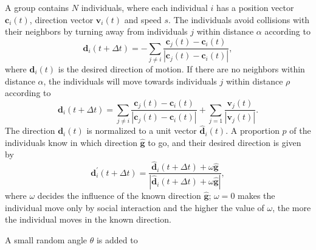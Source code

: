 A group contains $N$ individuals, where each individual $i$ has a position vector $\boldsymbol{c}_i(t)$, direction vector $\boldsymbol{v}_i(t)$ and speed $s$. The individuals avoid collisions with their neighbors by turning away from individuals $j$ within distance $\alpha$ according to
\begin{equation}
\boldsymbol{d}_i (t+\Delta t) = - \sum_{j \neq i} \frac{\boldsymbol{c}_j (t) - \boldsymbol{c}_i (t)}{|\boldsymbol{c}_j (t) - \boldsymbol{c}_i (t) |},
\label{eq:repulsion}
\end{equation}
where $\boldsymbol{d}_i(t)$ is the desired direction of motion. If there are no neighbors within distance $\alpha$, the individuals will move towards individuals $j$ within distance $\rho$ according to
\begin{equation}
\boldsymbol{d}_i (t+\Delta t) = \sum_{j \neq i} \frac{\boldsymbol{c}_j (t)- \boldsymbol{c}_i (t)}{|\boldsymbol{c}_j (t) - \boldsymbol{c}_i (t)|} + \sum_{j = 1} \frac{\boldsymbol{v}_j (t)}{|\boldsymbol{v}_j (t)|}.
\label{eq:attraction}
\end{equation}
The direction $\boldsymbol{d}_i(t)$ is normalized to a unit vector $\hat{\boldsymbol{d}}_i(t)$. A proportion $p$ of the individuals know in which direction $\hat{\boldsymbol{g}}$ to go, and their desired direction is given by
\begin{equation}
\boldsymbol{d}_i^\prime (t+\Delta t) = \frac{\hat{\boldsymbol{d}}_i (t+\Delta t) + \omega \hat{\boldsymbol{g}}}{|\hat{\boldsymbol{d}}_i (t+\Delta t) + \omega \hat{\boldsymbol{g}}|},
\label{eq:attraction}
\end{equation}
where $\omega$ decides the influence of the known direction $\hat{\boldsymbol{g}}$; $\omega=0$ makes the individual move only by social interaction and the higher the value of $\omega$, the more the individual moves in the known direction.

A small random angle $\theta$ is added to 
